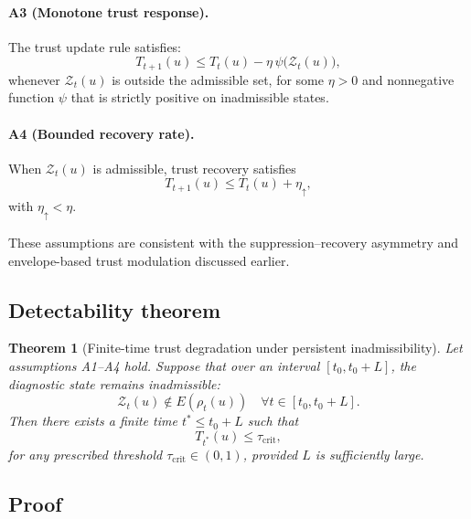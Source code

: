 \documentclass[11pt]{article}
\theoremstyle{definition}
\theoremstyle{plain}
\newtheorem{theorem}[definition]{Theorem}
\begin{document}
\paragraph{A3 (Monotone trust response).}
The trust update rule satisfies:
\begin{equation}
T_{t+1}(u)\le T_t(u) - \eta\,\psi\!\bigl(\mathcal{Z}_t(u)\bigr),
\end{equation}
whenever $\mathcal{Z}_t(u)$ is outside the admissible set, for some $\eta>0$ and nonnegative function $\psi$ that is strictly positive on inadmissible states.

\paragraph{A4 (Bounded recovery rate).}
When $\mathcal{Z}_t(u)$ is admissible, trust recovery satisfies
\begin{equation}
T_{t+1}(u)\le T_t(u) + \eta_{\uparrow},
\end{equation}
with $\eta_{\uparrow}<\eta$.

These assumptions are consistent with the suppression–recovery asymmetry and envelope-based trust modulation discussed earlier.


\subsection{Detectability theorem}

\begin{theorem}[Finite-time trust degradation under persistent inadmissibility]
\label{thm:detectability}
Let assumptions A1–A4 hold. Suppose that over an interval $[t_0,t_0+L]$, the diagnostic state remains inadmissible:
\begin{equation}
\mathcal{Z}_t(u)\notin E(\rho_t(u)) \quad \forall t\in[t_0,t_0+L].
\end{equation}
Then there exists a finite time $t^\ast\le t_0+L$ such that
\begin{equation}
T_{t^\ast}(u)\le \tau_{\mathrm{crit}},
\end{equation}
for any prescribed threshold $\tau_{\mathrm{crit}}\in(0,1)$, provided $L$ is sufficiently large.
\end{theorem}


\subsection{Proof}
\end{document}
